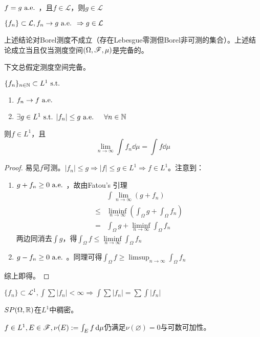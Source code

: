 \documentclass{ctexart}
\begin{document}
\begin{Rmk}
  $f=g\text{ a.e. }$，且$f\in\mathcal{L}$，则$g\in\mathcal{L}$

  $\{f_{n}\}\subset \mathcal{L},f_{n}\to g\text{ a.e. }\Rightarrow g\in \mathcal{L}$

  上述结论对Borel测度不成立（存在Lebesgue零测但Borel非可测的集合）。上述结论成立当且仅当测度空间$(\Omega,\mathscr{F},\mu)$是完备的。
\end{Rmk}

下文总假定测度空间完备。

\begin{Thm}
  $\{f_{n}\}_{n\in\mathbb{N}}\subset L^{1}\text{ s.t. }$
  \begin{enumerate}
  \item $f_{n}\to f\text{ a.e. }$
  \item $\exists g\in L^{1}\text{ s.t. } |f_{n}|\leq g\text{ a.e. }\quad\forall n\in\mathbb{N}$
  \end{enumerate}
  则$f\in L^{1}$，且\[\lim_{n\to\infty}\int f_{n}\dd\mu=\int f\dd\mu\]
\end{Thm}

\begin{proof}
  易见$f$可测。$|f_{n}|\leq g\Rightarrow |f|\leq g\in L^{1}\Rightarrow f\in L^{1}$。注意到：
  \begin{enumerate}
  \item $g+f_{n}\geq 0\text{ a.e. }$，故由Fatou's 引理
    \begin{align*}
      &\int \lim_{n\to\infty}(g+f_{n})\\
      \leq &\liminf_{n\to\infty}(\int_{\Omega}g+\int_{\Omega}f_{n})\\
      =&\int_{\Omega}g+\liminf_{n\to\infty}\int_{\Omega}f_{n}
      \end{align*}
    两边同消去$\int g$，得$\int_{\Omega}f\leq\liminf\limits_{n\to\infty}\int_{\Omega}f_{n}$
  \item $g-f_{n}\geq 0\text{ a.e. }$。同理可得$\int_{\Omega}f\geq\limsup_{n\to\infty}\int_{\Omega}f_{n}$
  \end{enumerate}
  综上即得。
\end{proof}

\begin{Eg}
  $\{f_{n}\}\subset \mathcal L^{1},\int\sum|f_{n}|<\infty\Rightarrow \int\sum|f_{n}|=\sum\int|f_{n}|$
\end{Eg}
\begin{Eg}
  $SP(\Omega,\mathbb{R})$在$L^{1}$中稠密。
\end{Eg}

\begin{Eg}[符号测度]
  $f\in L^{1},E\in\mathscr{F},\nu(E):=\int_{E}f\,\mathrm{d}\mu$仍满足$\nu(\varnothing)=0$与可数可加性。
\end{Eg}
\end{document}
